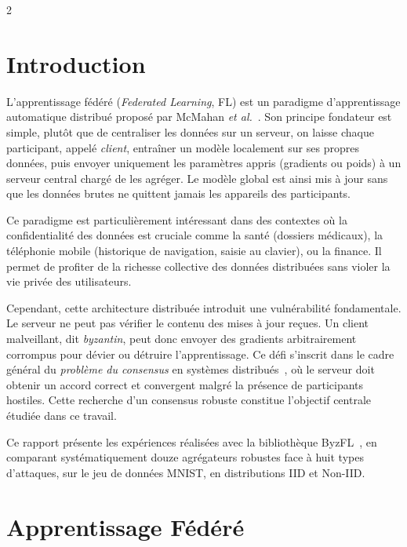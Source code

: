 \documentclass{article}
\begin{document}
\begin{multicols}{2}

\section{Introduction}

L'apprentissage f\'ed\'er\'e (\textit{Federated Learning}, FL) est un paradigme d'apprentissage
automatique distribu\'e propos\'e par McMahan \textit{et al.}~\cite{mcmahan2017}. Son principe
fondateur est simple, plut\^ot que de centraliser les donn\'ees sur un serveur, on laisse
chaque participant, appel\'e \textit{client}, entra\^iner un mod\`ele localement sur ses propres
donn\'ees, puis envoyer uniquement les param\`etres appris (gradients ou poids) \`a un serveur central
charg\'e de les agr\'eger. Le mod\`ele global est ainsi mis \`a jour sans que les donn\'ees brutes
ne quittent jamais les appareils des participants.

Ce paradigme est particuli\`erement int\'eressant dans des contextes o\`u la confidentialit\'e
des donn\'ees est cruciale comme la sant\'e (dossiers m\'edicaux), la t\'el\'ephonie mobile (historique de
navigation, saisie au clavier), ou la finance. Il permet de profiter de la richesse collective
des donn\'ees distribu\'ees sans violer la vie priv\'ee des utilisateurs.

Cependant, cette architecture distribu\'ee introduit une vuln\'erabilit\'e fondamentale. Le
serveur ne peut pas v\'erifier le contenu des mises \`a jour re\c{c}ues. Un client malveillant, dit \textit{byzantin}, peut donc envoyer des gradients arbitrairement corrompus pour
d\'evier ou d\'etruire l'apprentissage. Ce d\'efi s'inscrit dans le cadre g\'en\'eral du \textit{probl\`eme
du consensus} en syst\`emes distribu\'es~\cite{lamport1982}, o\`u le serveur doit obtenir un accord correct et convergent malgr\'e la pr\'esence de participants hostiles. Cette recherche d'un consensus robuste constitue l'objectif centrale \'etudi\'ee dans ce travail.

Ce rapport pr\'esente les exp\'eriences r\'ealis\'ees avec la biblioth\`eque ByzFL~\cite{byzfl2023},
en comparant syst\'ematiquement douze agr\'egateurs robustes face \`a huit types d'attaques,
sur le jeu de donn\'ees MNIST, en distributions IID et Non-IID.
\section{Apprentissage F\'ed\'er\'e}


\end{multicols}
\end{document}
